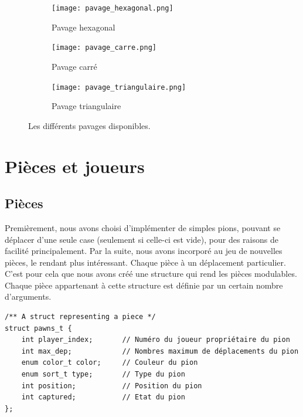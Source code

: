         \begin{figure}[H]
            \centering
            \begin{subfigure}{0.3\textwidth}
                \centering
                \texttt{[image: pavage\_hexagonal.png]}
                \caption{Pavage hexagonal\footnotemark[2]{}}
                \label{fig:pavage_hexagonal}
            \end{subfigure}
            \quad
            \begin{subfigure}{0.3\textwidth}
                \centering
                \texttt{[image: pavage\_carre.png]}
                \caption{Pavage carré\footnotemark[3]{}}
                \label{fig:pavage_carre}
            \end{subfigure}
            \quad 
            \begin{subfigure}{0.3\textwidth}
                \centering
                \texttt{[image: pavage\_triangulaire.png]}
                \caption{Pavage triangulaire\footnotemark[4]{}}
                \label{fig:pavage_triangulaire}
            \end{subfigure}
            \caption{Les différents pavages disponibles.}
            \label{label_de_la_figure 1}
        \end{figure}

\section{Pièces et joueurs}
    \subsection{Pièces}\label{part:pawns}
        Premièrement, nous avons choisi d'implémenter de simples pions, pouvant se déplacer d'une seule case (seulement si celle-ci est vide), pour des raisons de facilité principalement. Par la suite, nous avons incorporé au jeu de nouvelles pièces, le rendant plus intéressant. Chaque pièce à un déplacement particulier. \\ 
        C'est pour cela que nous avons créé une structure qui rend les pièces modulables. Chaque pièce appartenant à cette structure est définie par un certain nombre d'arguments.
        \medbreak
        \begin{lstlisting}
/** A struct representing a piece */
struct pawns_t {
    int player_index;       // Numéro du joueur propriétaire du pion
    int max_dep;            // Nombres maximum de déplacements du pion
    enum color_t color;     // Couleur du pion
    enum sort_t type;       // Type du pion
    int position;           // Position du pion
    int captured;           // Etat du pion
};\end{lstlisting}

